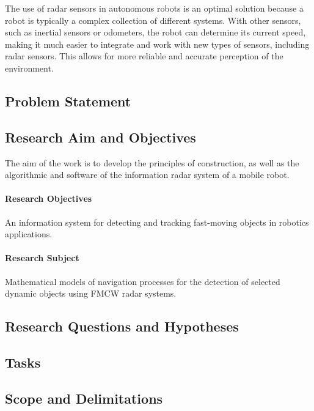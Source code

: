 The use of radar sensors in autonomous robots is an optimal solution because a robot is typically a complex collection of different systems. With other sensors, such as inertial sensors or odometers, the robot can determine its current speed, making it much easier to integrate and work with new types of sensors, including radar sensors. This allows for more reliable and accurate perception of the environment.


\subsection{Problem Statement}


\subsection{ Research Aim and Objectives}
The aim of the work is to develop the principles of construction, as well as the algorithmic and software of the information radar system of a mobile robot.


\paragraph{Research Objectives}
An information system for detecting and tracking fast-moving objects in robotics applications.


\paragraph{Research Subject}
Mathematical models of navigation processes for the detection of selected dynamic objects using FMCW radar systems.




\subsection{Research Questions and Hypotheses}







\subsection{Tasks}



\subsection{Scope and Delimitations}





